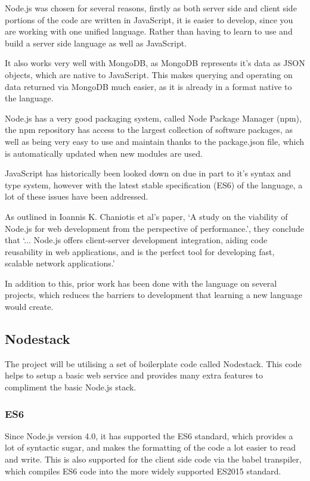 Node.js was chosen for several reasons, firstly as both server side and client side portions of the code are written in JavaScript, it is easier to develop, since you are working with one unified language. Rather than having to learn to use and build a server side language as well as JavaScript.

It also works very well with MongoDB, as MongoDB represents it's data as JSON objects, which are native to JavaScript. This makes querying and operating on data returned via MongoDB much easier, as it is already in a format native to the language. 

Node.js has a very good packaging system, called Node Package Manager (npm), the npm repository has access to the largest collection\cite{modulecounts} of software packages, as well as being very easy to use and maintain thanks to the package.json file, which is automatically updated when new modules are used. 

JavaScript has historically been looked down on due in part to it's syntax and type system, however with the latest stable specification\cite{es6} (ES6) of the language, a lot of these issues have been addressed. 

As outlined in Ioannis K. Chaniotis et al's paper, `A study on the viability of Node.js for web development from the perspective of performance.', they conclude that `... Node.js offers client-server development integration, aiding code reusability in web applications, and is the perfect tool for developing fast, scalable network applications.'\cite{node-perf}

In addition to this, prior work has been done with the language on several projects, which reduces the barriers to development that learning a new language would create. 

\subsection{Nodestack}
The project will be utilising a set of boilerplate code called Nodestack\cite{nodestack}. This code helps to setup a basic web service and provides many extra features to compliment the basic Node.js stack. 

\subsubsection*{ES6}

    Since Node.js version 4.0, it has supported the ES6 standard, which provides a lot of syntactic sugar, and makes the formatting of the code a lot easier to read and write. This is also supported for the client side code via the babel transpiler, which compiles ES6 code into the more widely supported ES2015 standard.

